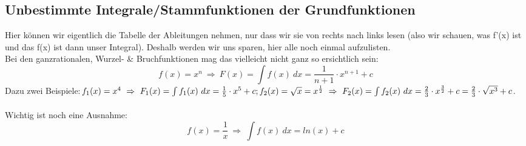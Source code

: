 \subsection{Unbestimmte Integrale/Stammfunktionen der Grundfunktionen}
	Hier können wir eigentlich die Tabelle der Ableitungen nehmen, nur dass wir sie
	von rechts nach links lesen (also wir schauen, was f'(x) ist und das f(x) ist
	dann unser Integral). Deshalb werden wir uns sparen, hier alle noch einmal
	aufzulisten.\\
	Bei den ganzrationalen, Wurzel- \& Bruchfunktionen mag das vielleicht nicht
	ganz so ersichtlich sein:
	\[f(x)=x^n\ \Rightarrow\ F(x)=\int f(x)\ dx=\frac{1}{n+1}\cdot x^{n+1}+c\]
	Dazu zwei Beispiele:\(f_1(x)=x^4\ \Rightarrow\ F_1(x)=\int f_1(x)\
	dx=\frac{1}{5}\cdot x^5+c;\\
	 f_2(x)=\sqrt{x}=x^\frac{1}{2}\ \Rightarrow\ F_2(x)=\int f_2(x)\
	 dx=\frac{2}{3}\cdot x^{\frac{3}{2}}+c=\frac{2}{3}\cdot \sqrt{x^3}+c\).\\ \\
	Wichtig ist noch eine Ausnahme:
	\[f(x)=\frac{1}{x}\ \Rightarrow\ \int f(x)\ dx=ln(x)+c\]
